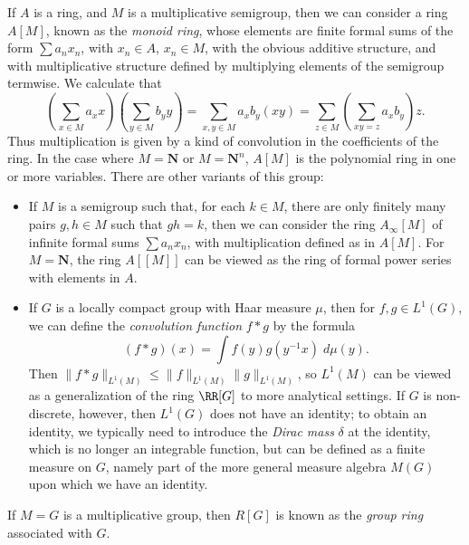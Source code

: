 \begin{example}
    If $A$ is a ring, and $M$ is a multiplicative semigroup, then we can consider a ring $A[M]$, known as the \emph{monoid ring}, whose elements are finite formal sums of the form $\sum a_n x_n$, with $x_n \in A$, $x_n \in M$, with the obvious additive structure, and with multiplicative structure defined by multiplying elements of the semigroup termwise. We calculate that
    \[ \left( \sum_{x \in M} a_x x \right) \left( \sum_{y \in M} b_y y \right) = \sum_{x,y \in M} a_x b_y (xy) = \sum_{z \in M} \left( \sum_{xy = z} a_x b_y \right) z. \]
    Thus multiplication is given by a kind of convolution in the coefficients of the ring. In the case where $M = \mathbf{N}$ or $M = \mathbf{N}^n$, $A[M]$ is the polynomial ring in one or more variables. There are other variants of this group:
    \begin{itemize}
        \item If $M$ is a semigroup such that, for each $k \in M$, there are only finitely many pairs $g,h \in M$ such that $gh = k$, then we can consider the ring $A_\infty[M]$ of infinite formal sums $\sum a_n x_n$, with multiplication defined as in $A[M]$. For $M = \mathbf{N}$, the ring $A[[M]]$ can be viewed as the ring of formal power series with elements in $A$.

        \item If $G$ is a locally compact group with Haar measure $\mu$, then for $f,g \in L^1(G)$, we can define the \emph{convolution function} $f * g$ by the formula
        \[ (f * g)(x) = \int f(y) g(y^{-1} x)\; d\mu(y). \]
        Then $\| f * g \|_{L^1(M)} \leq \| f \|_{L^1(M)} \| g \|_{L^1(M)}$, so $L^1(M)$ can be viewed as a generalization of the ring $\RR[G]$ to more analytical settings. If $G$ is non-discrete, however, then $L^1(G)$ does not have an identity; to obtain an identity, we typically need to introduce the \emph{Dirac mass} $\delta$ at the identity, which is no longer an integrable function, but can be defined as a finite measure on $G$, namely part of the more general measure algebra $M(G)$ upon which we have an identity.
    \end{itemize}
    If $M = G$ is a multiplicative group, then $R[G]$ is known as the \emph{group ring} associated with $G$.
\end{example}

